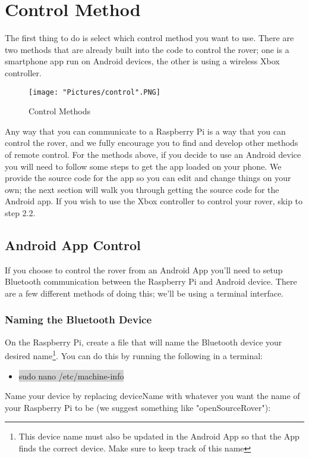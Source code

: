 \documentclass[12pt]{article}
\begin{document}
\section{Control Method}

The first thing to do is select which control method you want to use. There are two methods that are already built into the code to control the rover; one is a smartphone app run on Android devices, the other is using a wireless Xbox controller. 

\begin{figure}[H]
 	\centering
	\texttt{[image: "Pictures/control".PNG]}
 	\caption{Control Methods}
	\label{controls}
\end{figure}

\noindent Any way that you can communicate to a Raspberry Pi is a way that you can control the rover, and we fully encourage you to find and develop other methods of remote control. For the methods above, if you decide to use an Android device you will need to follow some steps to get the app loaded on your phone. We provide the source code for the app so you can edit and change things on your own; the next section will walk you through getting the source code for the Android app.  If you wish to use the Xbox controller to control your rover, skip to step 2.2.

\subsection{Android App Control}
If you choose to control the rover from an Android App you'll need to setup Bluetooth communication between the Raspberry Pi and Android device. There are a few different methods of doing this; we'll be using a terminal interface.

\subsubsection{Naming the Bluetooth Device}

On the Raspberry Pi, create a file that will name the Bluetooth device your desired name\footnote{This device name must also be updated in the Android App so that the App finds the correct device. Make sure to keep track of this name}. You can do this by running the following in a terminal: 
\begin{itemize}
	\item[] \colorbox{lightgray}{sudo nano /etc/machine-info} 
\end{itemize}
\noindent Name your device by replacing deviceName with whatever you want the name of your Raspberry Pi to be (we suggest something like "openSourceRover"):
\end{document}
